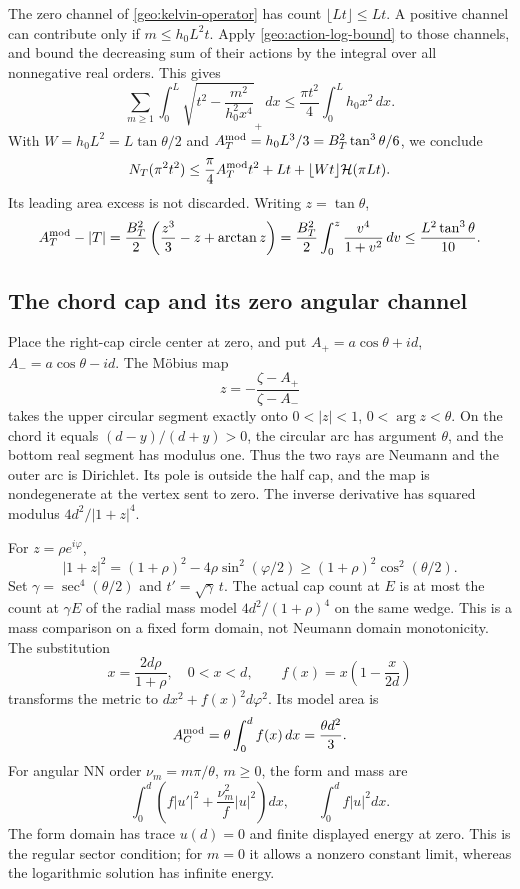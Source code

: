 \documentclass[11pt,reqno]{amsart}
\numberwithin{equation}{section}
\begin{document}
The zero channel of \eqref{geo:kelvin-operator} has count
$\lfloor Lt\rfloor\le Lt$.  A positive channel can contribute only if
$m\le h_0L^2t$.  Apply \eqref{geo:action-log-bound} to those channels,
and bound the decreasing sum of their actions by the integral over
all nonnegative real orders.  This gives
\[
 \sum_{m\ge1}\int_0^L
       \sqrt{t^2-\frac{m^2}{h_0^2x^4}}_+\,dx
       \le\frac{\pi t^2}{4}\int_0^Lh_0x^2\,dx.
\]
With $W=h_0L^2=L\tan\theta/2$ and
$A_T^{\rm mod}=h_0L^3/3=B_T^2\tan^3\theta/6$, we conclude
\begin{equation}\label{geo:top-count}
 N_T(\pi^2t^2)\le\frac\pi4A_T^{\rm mod}t^2
                  +Lt+\lfloor Wt\rfloor\mathcal H(\pi Lt).
\end{equation}
Its leading area excess is not discarded.  Writing $z=\tan\theta$,
\begin{equation}\label{geo:top-area-error}
 A_T^{\rm mod}-|T|
  =\frac{B_T^2}{2}\left(\frac{z^3}{3}-z+\arctan z\right)
  =\frac{B_T^2}{2}\int_0^z\frac{v^4}{1+v^2}\,dv
  \le\frac{L^2\tan^3\theta}{10}.
\end{equation}

\subsection{The chord cap and its zero angular channel}
\label{geo:mobius}

Place the right-cap circle center at zero, and put
$A_+=a\cos\theta+id$, $A_-=a\cos\theta-id$.  The M\"obius map
\[
 z=-\frac{\zeta-A_+}{\zeta-A_-}
\]
takes the upper circular segment exactly onto
$0<|z|<1$, $0<\arg z<\theta$.  On the chord it equals
$(d-y)/(d+y)>0$, the circular arc has argument $\theta$, and the
bottom real segment has modulus one.  Thus the two rays are Neumann
and the outer arc is Dirichlet.  Its pole is outside the half cap, and
the map is nondegenerate at the vertex sent to zero.  The inverse
derivative has squared modulus $4d^2/|1+z|^4$.

For $z=\rho e^{i\varphi}$,
\[
 |1+z|^2=(1+\rho)^2-4\rho\sin^2(\varphi/2)
              \ge(1+\rho)^2\cos^2(\theta/2).
\]
Set $\gamma=\sec^4(\theta/2)$ and $t'=\sqrt\gamma\,t$.
The actual cap count at $E$ is at most the count at $\gamma E$ of the
radial mass model $4d^2/(1+\rho)^4$ on the same wedge.  This is a mass
comparison on a fixed form domain, not Neumann domain monotonicity.
The substitution
\[
 x=\frac{2d\rho}{1+\rho},\quad0<x<d,\qquad
 f(x)=x\left(1-\frac{x}{2d}\right)
\]
transforms the metric to $dx^2+f(x)^2d\varphi^2$.  Its model area is
\[
 A_C^{\rm mod}=\theta\int_0^df(x)\,dx=\frac{\theta d^2}{3}.
\]
For angular NN order $\nu_m=m\pi/\theta$, $m\ge0$, the form and mass are
\begin{equation}\label{geo:weighted-cap-form}
 \int_0^d\left(f|u'|^2+\frac{\nu_m^2}{f}|u|^2\right)dx,
 \qquad \int_0^df|u|^2dx.
\end{equation}
The form domain has trace $u(d)=0$ and finite displayed energy at zero.
This is the regular sector condition; for $m=0$ it allows a nonzero
constant limit, whereas the logarithmic solution has infinite energy.
\end{document}
